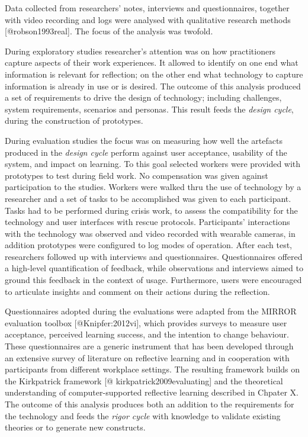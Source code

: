 Data collected from researchers' notes, interviews and questionnaires,
together with video
recording and
logs were analysed with qualitative research methods
{[}@robson1993real{]}. The focus of the analysis was twofold.

During exploratory studies researcher's attention was on how
practitioners capture aspects of their work experiences. It allowed to
identify on one end what information is relevant for reflection; on the
other end what technology to capture information is already in use or is
desired. The outcome of this analysis produced a set of requirements to
drive the design of technology; including challenges, system
requirements, scenarios and personas. This result feeds the \emph{design
cycle}, during the construction of prototypes.

During evaluation studies the focus was on measuring how well the
artefacts produced in the \emph{design cycle} perform against user
acceptance, usability of the system, and impact on learning. To this
goal selected workers were provided with prototypes to test during field
work. No compensation was given against participation to the studies.
Workers were walked thru the use of technology by a researcher and a set
of tasks to be accomplished was given to each participant. Tasks had to
be performed during crisis work, to assess the compatibility for the
technology and user interfaces with rescue protocols. Participants'
interactions with the technology was observed and video recorded with
wearable cameras, in addition prototypes were configured to log modes of
operation. After each test, researchers followed up with interviews and
questionnaires. Questionnaires offered a high-level quantification of
feedback, while observations and interviews aimed to ground this
feedback in the context of usage. Furthermore, users were encouraged to
articulate insights and comment on their actions during the reflection.

Questionnaires adopted during the evaluations were adapted from the
MIRROR evaluation toolbox {[}@Knipfer:2012vi{]}, which provides surveys
to measure user acceptance, perceived learning success, and the
intention to change behaviour. These questionnaires are a generic
instrument that has been developed through an extensive survey of
literature on reflective learning and in cooperation with participants
from different workplace settings. The resulting framework builds on the
Kirkpatrick framework {[}@
kirkpatrick2009evaluating{]}
and the theoretical understanding of computer-supported reflective
learning described in Chpater X. The outcome of this analysis produces
both an addition to the requirements for the technology and feeds the
\emph{rigor cycle} with knowledge to validate existing theories or to
generate new constructs.

